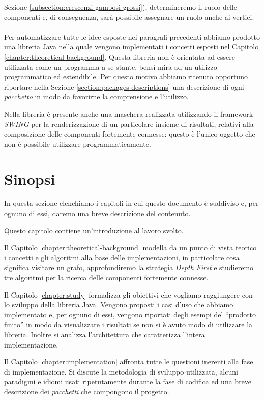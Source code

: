 Sezione \ref{subsection:crescenzi-gambosi-grossi}), determineremo il
ruolo delle componenti e, di conseguenza, sar\`a possibile assegnare
un ruolo anche ai vertici.
\\\\
Per automatizzare tutte le idee esposte nei paragrafi precedenti
abbiamo prodotto una libreria Java nella quale vengono implementati i
concetti esposti nel Capitolo
\ref{chapter:theoretical-background}. Questa libreria non \`e
orientata ad essere utilizzata come un programma a se stante, bens\`i
mira ad un utilizzo programmatico ed estendibile. Per questo motivo
abbiamo ritenuto opportuno riportare nella Sezione
\ref{section:packages-descriptions} una descrizione di ogni
\emph{pacchetto} in modo da favorirne la comprensione e l'utilizzo.

Nella libreria \`e presente anche una maschera realizzata utilizzando
il framework \emph{SWING} per la renderizzazione di un particolare
insieme di risultati, relativi alla composizione delle componenti
fortemente connesse: questo \`e l'unico oggetto che non \`e possibile
utilizzare programmaticamente.

\section{Sinopsi}
In questa sezione elenchiamo i capitoli in cui questo documento \`e
suddiviso e, per ognuno di essi, daremo una breve descrizione del
contenuto.

Questo capitolo contiene un'introduzione al lavoro svolto.

Il Capitolo \ref{chapter:theoretical-background} modella da un punto
di vista teorico i concetti e gli algoritmi alla base delle
implementazioni, in particolare cosa significa visitare un grafo,
approfondiremo la strategia \emph{Depth First} e studieremo tre
algoritmi per la ricerca delle componenti fortemente connesse.

Il Capitolo \ref{chapter:study} formalizza gli obiettivi che vogliamo
raggiungere con lo sviluppo della libreria Java. Vengono proposti i
casi d'uso che abbiamo implementato e, per ognuno di essi, vengono
riportati degli esempi del ``prodotto finito'' in modo da visualizzare
i risultati se non si \`e avuto modo di utilizzare la
libreria. Inoltre si analizza l'architettura che caratterizza l'intera
implementazione.

Il Capitolo \ref{chapter:implementation} affronta tutte le questioni
inerenti alla fase di implementazione. Si discute la metodologia di
sviluppo utilizzata, alcuni paradigmi e idiomi usati ripetutamente
durante la fase di codifica ed una breve descrizione dei
\emph{pacchetti} che compongono il progetto.

